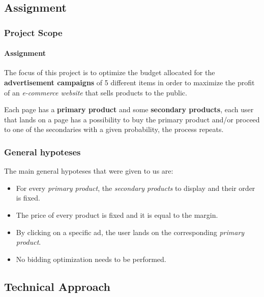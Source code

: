 
\subsection{Assignment}


\begin{frame}

\frametitle{Project Scope}
\framesubtitle{Assignment}

The focus of this project is to optimize the budget allocated for the \textbf{advertisement campaigns} of 5 different items in order to maximize the profit of an \textit{e-commerce website} that sells products to the public.

Each page has a \textbf{primary product} and some \textbf{secondary products}, each user that lands on a page has a possibility to buy the primary product and/or proceed to one of the secondaries with a given probability, the process repeats.

\end{frame}



\begin{frame}

\frametitle{General hypoteses}

The main general hypoteses that were given to us are:
\begin{itemize}[label={-}]
    \item For every \textit{primary product}, the \textit{secondary products} to display and their order is fixed.
    \item The price of every product is fixed and it is equal to the margin.
    \item By clicking on a specific ad, the user lands on the corresponding \textit{primary product}.
    \item No bidding optimization needs to be performed.
\end{itemize}

\end{frame}


\subsection{Technical Approach}

